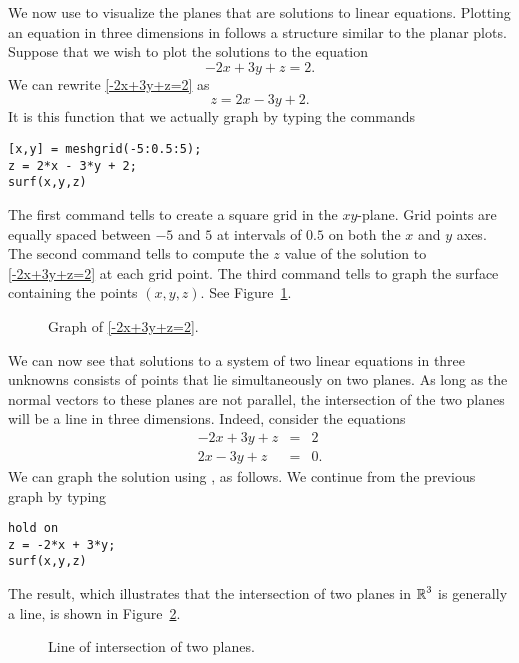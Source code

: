 \documentclass{ximera}
\begin{document}
We now use \Matlab to visualize the planes that are solutions to
linear equations.  Plotting an equation in three dimensions in
\Matlab follows a structure similar to the planar plots.
Suppose that we wish to plot the solutions to the equation
\begin{equation} \label{-2x+3y+z=2}
-2x+3y+z=2.
\end{equation}
We can rewrite \eqref{-2x+3y+z=2} as
\[
z=2x-3y+2.
\]
It is this function that we actually graph by typing the
commands
\begin{verbatim}
[x,y] = meshgrid(-5:0.5:5);
z = 2*x - 3*y + 2;
surf(x,y,z)
\end{verbatim}   
The first command tells \Matlab to create a square grid in the
$xy$-plane.  Grid points are
equally spaced between $-5$ and $5$ at intervals of $0.5$ on
both the $x$ and $y$ axes. The second command tells \Matlab to
compute the $z$ value of the solution to \eqref{-2x+3y+z=2} at
each grid point.  The third command tells \Matlab to graph the
surface containing the points $(x,y,z)$.  See
Figure~\ref{F:p1int}.

\begin{figure}[htb]
              \centerline{%
              }
              \caption{Graph of \protect\eqref{-2x+3y+z=2}.}
              \label{F:p1int}
\end{figure}


We can now see that solutions to a system of two linear
equations in three unknowns consists of points that lie
simultaneously on two planes.  As long as the normal vectors to
these planes are not parallel, the intersection of the two
planes will be a line in three dimensions.  Indeed, consider the
equations
\begin{eqnarray*}
-2x + 3y + z & = & 2 \\
 2x - 3y + z & = & 0.
\end{eqnarray*}
We can graph the solution using \Matlab, as follows. We continue
from the previous graph by typing
\begin{verbatim}
hold on
z = -2*x + 3*y;
surf(x,y,z)
\end{verbatim}
The result, which illustrates that the intersection of two planes
in $\mbox{$\Bbb{R}$}^3$ is generally a line, is shown in Figure~\ref{F:p2int}.

\begin{figure}[htb]
              \centerline{%
              }
              \caption{Line of intersection of two planes.}
              \label{F:p2int}
\end{figure}
\end{document}
